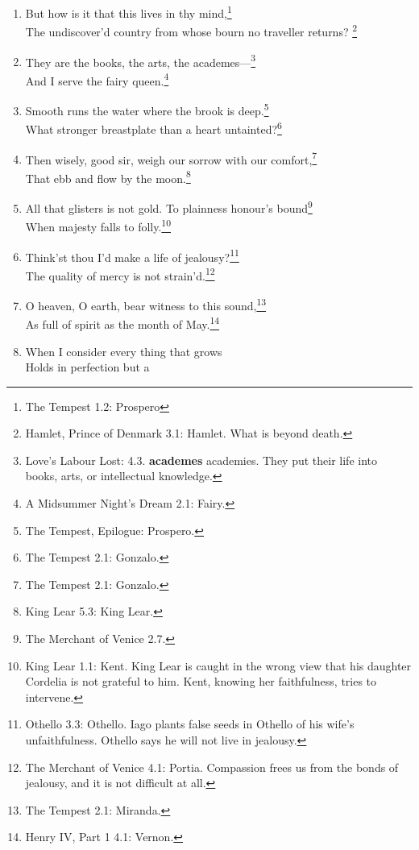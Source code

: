 \documentclass[17pt,twoside]{extarticle}
\begin{document}
\begin{enumerate}
{    is impermanence.}\\The wheel is come full circle: I am
  here.\footnote{King Lear 5.3: Edmund. On discovering his half-brother
    Edgar.}
\item
  But how is it that this lives in thy mind,\footnote{The Tempest 1.2:
    Prospero}\\The undiscover'd country from whose bourn no traveller
  returns? \footnote{Hamlet, Prince of Denmark 3.1: Hamlet. What is
    beyond death.}
\item
  They are the books, the arts, the academes---\footnote{Love's Labour
    Lost: 4.3. \textbf{academes} academies. They put their life into
    books, arts, or intellectual knowledge.}\\And I serve the fairy
  queen.\footnote{A Midsummer Night's Dream 2.1: Fairy.}
\item
  Smooth runs the water where the brook is deep.\footnote{The Tempest,
    Epilogue: Prospero.}\\What stronger breastplate than a heart
  untainted?\footnote{The Tempest 2.1: Gonzalo.}
\item
  Then wisely, good sir, weigh our sorrow with our comfort,\footnote{The
    Tempest 2.1: Gonzalo.}\\That ebb and flow by the moon.\footnote{King
    Lear 5.3: King Lear.}
\item
  All that glisters is not gold. To plainness honour's bound\footnote{The
    Merchant of Venice 2.7.}\\When majesty falls to folly.\footnote{King
    Lear 1.1: Kent. King Lear is caught in the wrong view that his
    daughter Cordelia is not grateful to him. Kent, knowing her
    faithfulness, tries to intervene.}
\item
  Think'st thou I'd make a life of jealousy?\footnote{Othello 3.3:
    Othello. Iago plants false seeds in Othello of his wife's
    unfaithfulness. Othello says he will not live in jealousy.}\\The
  quality of mercy is not strain'd.\footnote{The Merchant of Venice 4.1:
    Portia. Compassion frees us from the bonds of jealousy, and it is
    not difficult at all.}
\item
  O heaven, O earth, bear witness to this sound,\footnote{The Tempest
    2.1: Miranda.}\\As full of spirit as the month of May.\footnote{Henry
    IV, Part 1 4.1: Vernon.}
\item
  When I consider every thing that grows\\Holds in perfection but a

\end{enumerate}
\end{document}
